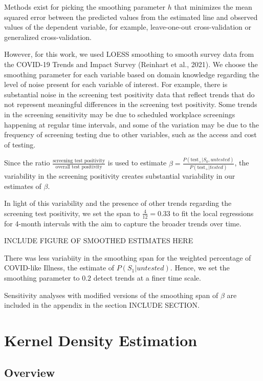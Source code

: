 \documentclass[12pt,twoside]{smiththesis}
\begin{document}
Methods exist for picking the smoothing parameter \(h\) that minimizes the mean squared error between the predicted values from the estimated line and observed values of the dependent variable, for example, leave-one-out cross-validation or generalized cross-validation.

However, for this work, we used LOESS smoothing to smooth survey data from the COVID-19 Trends and Impact Survey (Reinhart et al., 2021).
We choose the smoothing parameter for each variable based on domain knowledge regarding the level of noise present for each variable of interest. For example, there is substantial noise in the screening test positivity data that reflect trends that do not represent meaningful differences in the screening test positivity. Some trends in the screening sensitivity may be due to scheduled workplace screenings happening at regular time intervals, and some of the variation may be due to the frequency of screening testing due to other variables, such as the access and cost of testing.

Since the ratio \(\frac{\text{screening test positivity}}{\text{overall test positivity}}\) is used to estimate \(\beta = \frac{P(\text{test}_+| S_0, untested)}{P(\text{test}_+|tested)}\), the variability in the screening positivity creates substantial variability in our estimates of \(\beta\).

In light of this variability and the presence of other trends regarding the screening test positivity, we set the span to \(\frac{4}{12} = 0.33\) to fit the local regressions for 4-month intervals with the aim to capture the broader trends over time.

INCLUDE FIGURE OF SMOOTHED ESTIMATES HERE

There was less variabiity in the smoothing span for the weighted percentage of COVID-like Illness, the estimate of \(P(S_1|untested)\). Hence, we set the smoothing parameter to \(0.2\) detect trends at a finer time scale.

Sensitivity analyses with modified versions of the smoothing span of \(\beta\) are included in the appendix in the section INCLUDE SECTION.

\newpage

\hypertarget{kernel-density-estimation}{%
\section{Kernel Density Estimation}\label{kernel-density-estimation}}

\hypertarget{overview-1}{%
\subsection{Overview}\label{overview-1}}
\end{document}
